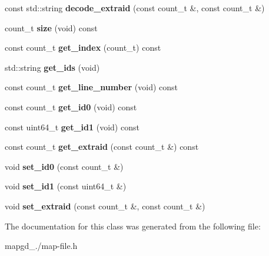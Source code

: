 \begin{DoxyCompactItemize}
\item 
\hypertarget{classgcf__file_aacff6f76ba7993a6ae6cd6a4eaaeeb88}{const std\-::string {\bfseries decode\-\_\-extraid} (const count\-\_\-t \&, const count\-\_\-t \&)}\label{classgcf__file_aacff6f76ba7993a6ae6cd6a4eaaeeb88}

\item 
\hypertarget{classgcf__file_a1d74acf5969f073d5c23fa67304a0008}{count\-\_\-t {\bfseries size} (void) const }\label{classgcf__file_a1d74acf5969f073d5c23fa67304a0008}

\item 
\hypertarget{classgcf__file_a9e147c667d622cfc752d79a702c1f9f9}{const count\-\_\-t {\bfseries get\-\_\-index} (count\-\_\-t) const }\label{classgcf__file_a9e147c667d622cfc752d79a702c1f9f9}

\item 
\hypertarget{classgcf__file_a1b0907de99ddc62d69d6d465fcaa3c0b}{std\-::string {\bfseries get\-\_\-ids} (void)}\label{classgcf__file_a1b0907de99ddc62d69d6d465fcaa3c0b}

\item 
\hypertarget{classgcf__file_a083be33078aa41b454446abfe7b9d546}{const count\-\_\-t {\bfseries get\-\_\-line\-\_\-number} (void) const }\label{classgcf__file_a083be33078aa41b454446abfe7b9d546}

\item 
\hypertarget{classgcf__file_af6beaf34a3bef12e55621edf50232958}{const count\-\_\-t {\bfseries get\-\_\-id0} (void) const }\label{classgcf__file_af6beaf34a3bef12e55621edf50232958}

\item 
\hypertarget{classgcf__file_a7c10bdda397949983be605efcb33e922}{const uint64\-\_\-t {\bfseries get\-\_\-id1} (void) const }\label{classgcf__file_a7c10bdda397949983be605efcb33e922}

\item 
\hypertarget{classgcf__file_a081a46146b7a0240f0bf2f8964e4d410}{const count\-\_\-t {\bfseries get\-\_\-extraid} (const count\-\_\-t \&) const }\label{classgcf__file_a081a46146b7a0240f0bf2f8964e4d410}

\item 
\hypertarget{classgcf__file_afbdea154a8d00f67ec6f8acb2be42162}{void {\bfseries set\-\_\-id0} (const count\-\_\-t \&)}\label{classgcf__file_afbdea154a8d00f67ec6f8acb2be42162}

\item 
\hypertarget{classgcf__file_a2e619e398bc6cd429980165f9f00324c}{void {\bfseries set\-\_\-id1} (const uint64\-\_\-t \&)}\label{classgcf__file_a2e619e398bc6cd429980165f9f00324c}

\item 
\hypertarget{classgcf__file_a3136bd858c2dd2dba8c8ebfee8b0bc70}{void {\bfseries set\-\_\-extraid} (const count\-\_\-t \&, const count\-\_\-t \&)}\label{classgcf__file_a3136bd858c2dd2dba8c8ebfee8b0bc70}

\end{DoxyCompactItemize}


The documentation for this class was generated from the following file\-:\begin{DoxyCompactItemize}
\item 
mapgd\-\_./map-\/file.\-h\end{DoxyCompactItemize}

